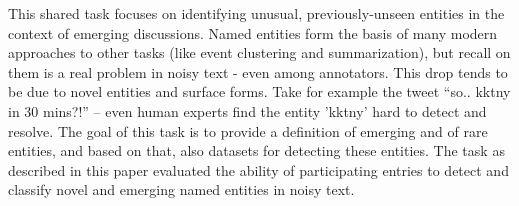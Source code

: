 This shared task focuses on identifying unusual, previously-unseen entities in the context of emerging discussions. Named entities form the basis of many modern approaches to other tasks (like event clustering and summarization), but recall on them is a real problem in noisy text - even among annotators. This drop tends to be due to novel entities and surface forms. Take for example the tweet ``so.. kktny in 30 mins?!'' -- even human experts find the entity 'kktny' hard to detect and resolve. The goal of this task is to provide a definition of emerging and of rare entities, and based on that, also datasets for detecting these entities. The task as described in this paper evaluated the ability of participating entries to detect and classify novel and emerging named entities in noisy text.
